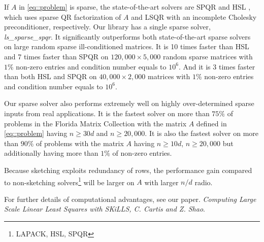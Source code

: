 \documentclass[english,11pt]{article}
\begin{document}
If $A$ in \eqref{eq::problem} is sparse, the state-of-the-art solvers are SPQR \cite{Davis:2011ft} and HSL \cite{Scott:2014iq}, which uses sparse QR factorization of $A$ and LSQR with an incomplete Cholesky preconditioner, respectively. Our library has a single sparse solver, {\it ls_sparse_spqr}. It significantly outperforms both state-of-the-art sparse solvers on large random sparse ill-conditioned matrices. It is 10 times faster than HSL and 7 times faster than SPQR on $120,000 \times 5,000$ random sparse matrices with $1\%$ non-zero entries and condition number equals to $10^6$. And it is 3 times faster than both HSL and SPQR on $40,000 \times 2,000$ matrices with $1\%$ non-zero entries and condition number equals to $10^6$.

Our sparse solver also performs extremely well on highly over-determined sparse inputs from real applications. It is the fastest solver on more than $75 \%$ of problems in the Florida Matrix Collection \cite{Davis_2011} with the matrix $A$ defined in \eqref{eq::problem} having $n\geq 30d$ and $n \geq 20,000$. It is also the fastest solver on more than $90\%$ of problems with the matrix $A$ having $n\geq 10d$, $n \geq 20,000$ but additionally having more than $1\%$ of non-zero entries. 

Because sketching exploits redundancy of rows, the performance gain compared to non-sketching solvers\footnote{LAPACK, HSL, SPQR} will be larger on $A$ with larger $n/d$ radio.

For further details of computational advantages, see our paper. {\it{Computing Large Scale Linear Least Squares with SKiLLS, C. Cartis and Z. Shao}}.



\end{document}
